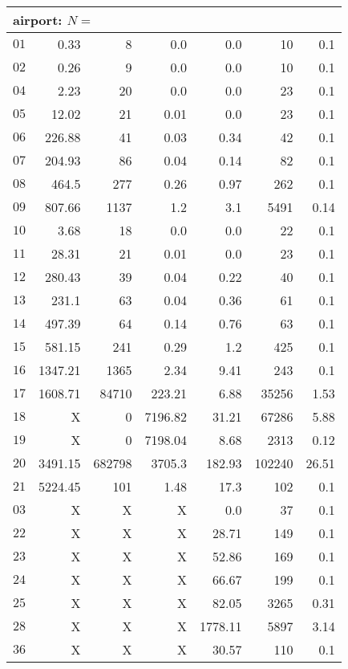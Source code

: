 \begin{longtable}{|c||r|r|r||r|r|r|}
\multicolumn{7}{|l|}{airport: $N=$}\\\hline
$01$ & 0.33 & 8 & 0.0 & 0.0 & 10 & 0.1 \\\hline
$02$ & 0.26 & 9 & 0.0 & 0.0 & 10 & 0.1 \\\hline
$04$ & 2.23 & 20 & 0.0 & 0.0 & 23 & 0.1 \\\hline
$05$ & 12.02 & 21 & 0.01 & 0.0 & 23 & 0.1 \\\hline
$06$ & 226.88 & 41 & 0.03 & 0.34 & 42 & 0.1 \\\hline
$07$ & 204.93 & 86 & 0.04 & 0.14 & 82 & 0.1 \\\hline
$08$ & 464.5 & 277 & 0.26 & 0.97 & 262 & 0.1 \\\hline
$09$ & 807.66 & 1137 & 1.2 & 3.1 & 5491 & 0.14 \\\hline
$10$ & 3.68 & 18 & 0.0 & 0.0 & 22 & 0.1 \\\hline
$11$ & 28.31 & 21 & 0.01 & 0.0 & 23 & 0.1 \\\hline
$12$ & 280.43 & 39 & 0.04 & 0.22 & 40 & 0.1 \\\hline
$13$ & 231.1 & 63 & 0.04 & 0.36 & 61 & 0.1 \\\hline
$14$ & 497.39 & 64 & 0.14 & 0.76 & 63 & 0.1 \\\hline
$15$ & 581.15 & 241 & 0.29 & 1.2 & 425 & 0.1 \\\hline
$16$ & 1347.21 & 1365 & 2.34 & 9.41 & 243 & 0.1 \\\hline
$17$ & 1608.71 & 84710 & 223.21 & 6.88 & 35256 & 1.53 \\\hline
$18$ & X & 0 & 7196.82 & 31.21 & 67286 & 5.88 \\\hline
$19$ & X & 0 & 7198.04 & 8.68 & 2313 & 0.12 \\\hline
$20$ & 3491.15 & 682798 & 3705.3 & 182.93 & 102240 & 26.51 \\\hline
$21$ & 5224.45 & 101 & 1.48 & 17.3 & 102 & 0.1 \\\hline
$03$ &  X &  X &  X & 0.0 & 37 & 0.1 \\\hline
$22$ &  X &  X &  X & 28.71 & 149 & 0.1 \\\hline
$23$ &  X &  X &  X & 52.86 & 169 & 0.1 \\\hline
$24$ &  X &  X &  X & 66.67 & 199 & 0.1 \\\hline
$25$ &  X &  X &  X & 82.05 & 3265 & 0.31 \\\hline
$28$ &  X &  X &  X & 1778.11 & 5897 & 3.14 \\\hline
$36$ &  X &  X &  X & 30.57 & 110 & 0.1 \\\hline

\end{longtable}
